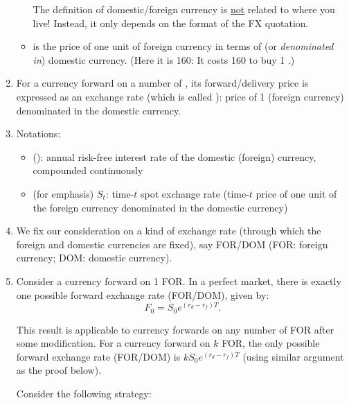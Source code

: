\begin{enumerate}
\begin{itemize}
\begin{warning}
The definition of domestic/foreign currency is \underline{not} related to where
you live! Instead, it only depends on the format of the FX quotation.
\end{warning}
\item {} is the price of one unit of foreign currency in
terms of (or \emph{denominated in}) domestic currency. (Here it is 160: It
costs 160 {\color{brown}} to buy 1
{\color{violet}}.)
\end{itemize}

\item For a currency forward on a number of , its
forward/delivery price is expressed as an exchange rate (which is called
): price of 1  (foreign currency)
denominated in the domestic currency.

\item Notations:
\begin{itemize}
\item {} (): annual risk-free interest rate of the domestic
(foreign) currency, compounded continuously
\item (for emphasis) \(S_t\): time-\(t\) spot exchange rate (time-\(t\) price of one unit of
the foreign currency denominated in the domestic currency)
\end{itemize}

\item We fix our consideration on a kind of exchange rate (through which the
foreign and domestic currencies are fixed), say FOR/DOM (FOR: foreign currency;
DOM: domestic currency).

\item \label{it:perfect-mkt-fwd-ex-rate}
Consider a currency forward on 1 FOR. In a perfect market, there is exactly one
possible forward exchange rate (FOR/DOM), given by:
\[
F_0=S_0e^{(r_d-r_f)T}.
\]
\begin{note}
This result is applicable to currency forwards on any number of FOR after some
modification. For a currency forward on \(k\) FOR, the only possible forward
exchange rate (FOR/DOM) is \(kS_0e^{(r_d-r_f)T}\) (using similar argument as
the proof below).
\end{note}

\begin{pf}
Consider the following strategy:


\end{pf}
\end{enumerate}
